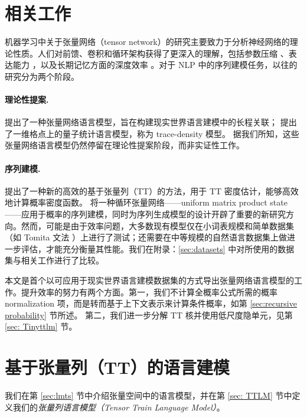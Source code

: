 \documentclass{article}
\theoremstyle{plain}
\theoremstyle{definition}
\theoremstyle{remark}
\begin{document}
\section{相关工作}

机器学习中关于张量网络（tensor network）的研究主要致力于分析神经网络的理论性质。人们对前馈、卷积和循环架构获得了更深入的理解，包括参数压缩 \citep{novikov2015tensorizing}、表达能力 \citep{cohen2016expressive, cohen2016convolutional, khrulkov2018expressive}，以及长期记忆方面的深度效率 \citep{levine2018benefits}。对于 NLP 中的序列建模任务，以往的研究分为两个阶段。

\paragraph{理论性提案.}
\citep{pestun2017tensor} 提出了一种张量网络语言模型，旨在构建现实世界语言建模中的长程关联；\citep{pestun2017language} 提出了一维格点上的量子统计语言模型，称为 trace-density 模型。
据我们所知，这些张量网络语言模型仍然停留在理论性提案阶段，而非实证性工作。


\paragraph{序列建模.} \cite{novikov2021tensor} 提出了一种新的高效的基于张量列（TT）的方法，用于 TT 密度估计，能够高效地计算概率密度函数。\cite{miller2021tensor} 将一种循环张量网络——uniform matrix product state——应用于概率的序列建模，同时为序列生成模型的设计开辟了重要的新研究方向。然而，可能是由于效率问题，大多数现有模型仅在小词表规模和简单数据集（如 Tomita 文法 \citep{tomita1982dynamic}）上进行了测试；还需要在中等规模的自然语言数据集上做进一步评估，才能充分衡量其性能。我们在附录：\ref{sec:datasets} 中对所使用的数据集与相关工作进行了比较。

本文是首个以可应用于现实世界语言建模数据集的方式导出张量网络语言模型的工作。提升效率的努力有两个方面。第一，我们不计算全概率公式所需的概率 normalization 项，而是转而基于上下文表示来计算条件概率，如第 \ref{sec:recursive probability} 节所述。
第二，我们进一步分解 TT 核并使用低尺度隐单元，见第 \ref{sec: Tinyttlm} 节。



\section{基于张量列（TT）的语言建模}
\label{sec:ttlm}

我们在第 \ref{sec:lmts} 节中介绍张量空间中的语言模型，并在第 \ref{sec: TTLM} 节中定义我们的\emph{张量列语言模型（Tensor Train Language Model）}。
\end{document}
